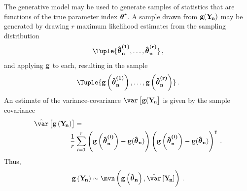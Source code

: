 \documentclass[
    11pt,
    extrafontsizes,
    article,
    oldfontcommands,
    final,
    oneside,
    openany,
    hidelinks]{memoir}
\begin{document}
The generative model may be used to generate samples of statistics that are functions of the true parameter index ${\boldsymbol{\mathbf{\theta}}}^{\star}$.
A sample drawn from $\boldsymbol{\mathbf{\operatorname{g}}}(\mathrm{\boldsymbol{\mathbf{Y_{\!n}}}})$ may be generated by drawing $r$ maximum likelihood estimates from the sampling distribution
\begin{equation}
\Tuple{\mleui{1}, \ldots, \mleui{r}}\,,
\end{equation}
and applying $\boldsymbol{\mathbf{\operatorname{g}}}$ to each, resulting in the sample
\begin{equation}
\label{eq:phi_sample}
\Tuple{
\vecstat\left(\mleui{1}\right),
\ldots,
\vecstat\left(\mleui{r}\right)}\,.
\end{equation}
An estimate of the variance-covariance $\var\left[\vecstat(\sampdu\right]$ is given by the sample covariance
\begin{equation}
\begin{split}
\estimator{\var}\left[\vecstat\left(\sampdu\right)\right] &=\\
& \!\!\!\! \frac{1}{r} \sum_{i=1}^{r}
\left(\vecstat\left(\mleui{i}\right) - \vecstat(\mleu)\right)
\left(\vecstat\left(\mleui{i}\right) - \vecstat(\mleu)\right)^\intercal\,.
\end{split}
\end{equation}
Thus,
\begin{equation}
\vecstat\left(\sampdu\right) \sim \mvn\left(\vecstat\left(\mleu\right), \estimator{\var}\left[\sampdu\right] \right)\,.
\end{equation}
\end{document}
